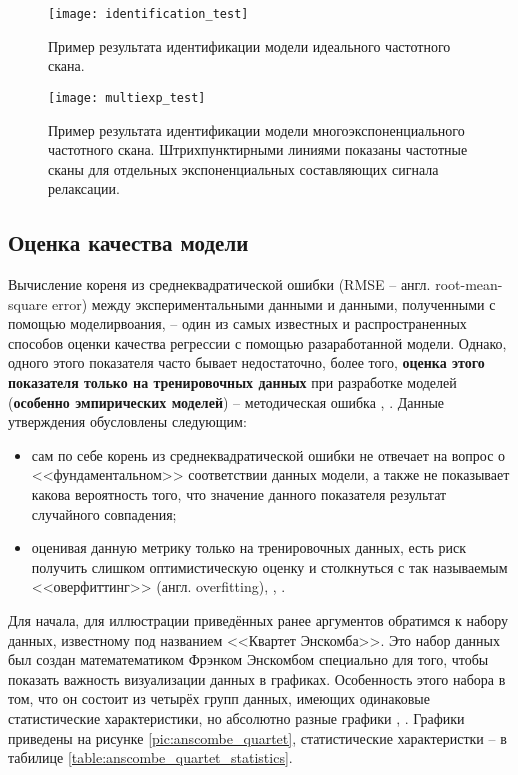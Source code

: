     \begin{figure}[!htp]
        \centering
        \texttt{[image: identification\_test]}
        \caption{Пример результата идентификации модели идеального частотного 
        скана.}
        \label{pic:identification_test}
    \end{figure}


    \begin{figure}[!htp]
        \centering
        \texttt{[image: multiexp\_test]}
        \caption{Пример результата идентификации модели многоэкспоненциального
        частотного скана. Штрихпунктирными линиями показаны частотные сканы для
        отдельных экспоненциальных составляющих сигнала релаксации.}
        \label{pic:multiexp_test}
    \end{figure}


    \subsection{Оценка качества модели}
    Вычисление кореня из среднеквадратической ошибки (RMSE -- англ. 
    root-mean-square error) между экспериментальными данными и данными, 
    полученными с помощью моделирвоания, -- один из самых известных и 
    распространенных способов оценки качества регрессии с помощью разаработанной 
    модели. Однако, одного этого показателя часто бывает недостаточно, более 
    того, \textbf{оценка этого показателя только на тренировочных данных} при 
    разработке моделей (\textbf{особенно эмпирических моделей}) -- методическая 
    ошибка \cite{hands_on_ml}, \cite{sklearn_cross_validation}. Данные 
    утверждения обусловлены следующим:
    \begin{itemize}
    	\item сам по себе корень из среднеквадратической ошибки не отвечает на 
    	вопрос о <<фундаментальном>> соответствии данных модели, а также не 
    	показывает какова вероятность того, что значение данного показателя
    	результат случайного совпадения;
    	\item оценивая данную метрику только на тренировочных данных, есть риск
    	получить слишком оптимистическую оценку и столкнуться с так называемым
    	<<оверфиттинг>> (англ. overfitting)\cite{hands_on_ml}, 
    	\cite{sklearn_cross_validation}, \cite{nikolenko_deep_learning}.
    \end{itemize}

    Для начала, для иллюстрации приведённых ранее аргументов обратимся к набору
    данных, известному под названием <<Квартет Энскомба>>. Это набор данных был 
    создан математематиком Фрэнком Энскомбом специально для того, чтобы показать
    важность визуализации данных в графиках. Особенность этого набора в том, что
    он состоит из четырёх групп данных, имеющих одинаковые статистические 
    характеристики, но абсолютно разные графики \cite{anscombe_quartet_wikipedia}, 
    \cite{anscombe_quartet_article}. Графики приведены на рисунке 
    \ref{pic:anscombe_quartet}, статистические характеристки -- в табилице 
    \ref{table:anscombe_quartet_statistics}.


